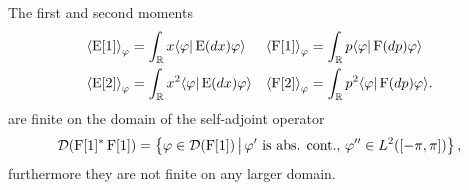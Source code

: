 \begin{thm}
  The first and second moments 
  \begin{align}
    \left\langle{\operatorname{E}[1]}\right\rangle_{\varphi} &= \int_{\mathbb{R}} x \langle \varphi|\operatorname{E}(dx)\varphi\rangle & \left\langle{\operatorname{F}[1]}\right\rangle_{\varphi} &= \int_{\mathbb{R}} p \langle \varphi|\operatorname{F}(dp)\varphi\rangle\\
    \left\langle{\operatorname{E}[2]}\right\rangle_{\varphi} &= \int_{\mathbb{R}} x^2 \langle \varphi|\operatorname{E}(dx)\varphi\rangle & \left\langle{\operatorname{F}[2]}\right\rangle_{\varphi} &= \int_{\mathbb{R}} p^2 \langle \varphi|\operatorname{F}(dp)\varphi\rangle. 
  \end{align}
  are finite on the domain of the self-adjoint operator
  \begin{align}\label{eqn:good-opf[2]-domain}
    \mathcal{D}(\operatorname{F}[1]^*\operatorname{F}[1]) = \left\{\varphi\in\mathcal{D}(\operatorname{F}[1])\,\middle|\,\varphi^{\prime} \text{ is abs. cont.},\,\varphi^{\prime\prime}\in L^2([-\pi,\pi])\right\},
  \end{align}
  furthermore they are not finite on any larger domain.
\end{thm}
